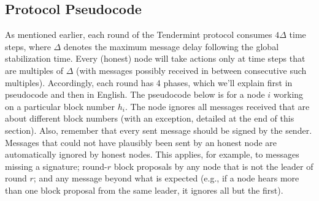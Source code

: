 \subsection{Protocol Pseudocode}
As mentioned earlier, each round of the Tendermint protocol consumes $4\Delta$ time steps,
where $\Delta$ denotes the maximum message delay following the global stabilization time. Every
(honest) node will take actions only at time steps that are multiples of $\Delta$ (with messages
possibly received in between consecutive such multiples). Accordingly, each round has 4
phases, which we’ll explain first in pseudocode and then in English.
The pseudocode below is for a node $i$ working on a particular block number $h_i$. The
node ignores all messages received that are about different block numbers (with an
exception, detailed at the end of this section). Also, remember that every sent message should
be signed by the sender. Messages that could not have plausibly been sent by an honest node
are automatically ignored by honest nodes. This applies, for example, to messages missing
a signature; round-$r$ block proposals by any node that is not the leader of round $r$; and any
message beyond what is expected (e.g., if a node hears more than one block proposal from
the same leader, it ignores all but the first).\\
